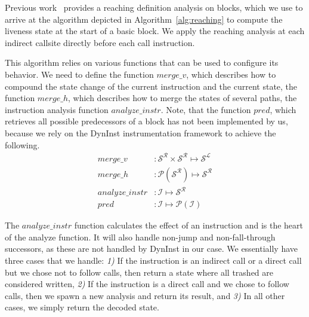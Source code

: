 %
%

Previous work~\cite{khedker2009data} provides a reaching definition analysis on blocks, which we use to arrive at the algorithm depicted in 
Algorithm~\ref{alg:reaching} to compute the liveness state at the start of a basic block. We apply the reaching analysis at each indirect 
callsite directly before each call instruction.

This algorithm relies on various functions that can be used to configure its behavior. We need to define the 
function $merge\_v$, which describes how to compound the state change of the current instruction and the current state, 
the function $merge\_h$, which describes how to merge the states of several paths, the instruction analysis function
$analyze\_instr$. Note, that the function $pred$, which retrieves all possible predecessors of a block has not been implemented by us, 
because we rely on the DynInst instrumentation framework to achieve the following.
\vspace{-.1cm}
\begin{subequations}
\label{eq:livenesscustom}
\begin{align}
merge\_v &: \mathcal{S}^\mathcal{R} \times \mathcal{S}^\mathcal{R} \mapsto \mathcal{S}^\mathcal{L}\\
merge\_h &: \mathcal{P}(\mathcal{S}^\mathcal{R}) \mapsto \mathcal{S}^\mathcal{R}\\
analyze\_instr &: \mathcal {I} \mapsto \mathcal{S}^\mathcal{R} \\
pred &: \mathcal{I} \mapsto \mathcal{P}(\mathcal{I})
\end{align}
\end{subequations}
\vspace{-.6cm}

The $analyze\_instr$ function calculates the effect of an instruction and is the heart of the analyze function. It will also 
handle non-jump and non-fall-through successors, as these are not handled by DynInst in our case. We essentially have three cases that we handle:
\textit{1)} If the instruction is an indirect call or a direct call but we chose not to follow calls, then return a state where all trashed are considered written,
\textit{2)} If the instruction is a direct call and we chose to follow calls, then we spawn a new analysis and return its result, and
\textit{3)} In all other cases, we simply return the decoded state.

